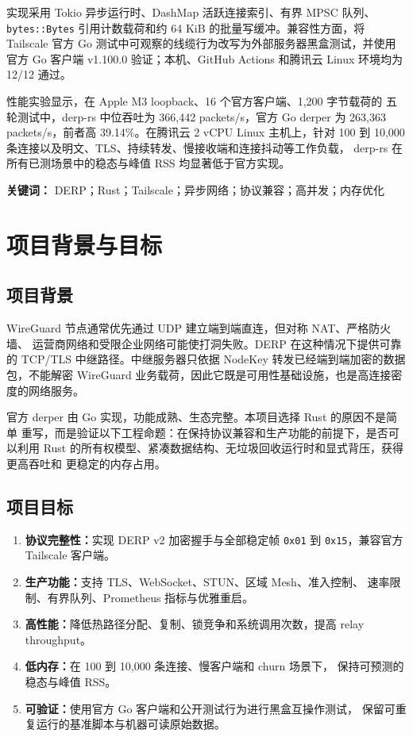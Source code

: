 \documentclass[UTF8,a4paper,zihao=-4]{ctexart}
\newcommand{\code}[1]{\texttt{\small #1}}
\begin{document}
实现采用 Tokio 异步运行时、DashMap 活跃连接索引、有界 MPSC 队列、
\code{bytes::Bytes} 引用计数载荷和约 64 KiB 的批量写缓冲。兼容性方面，将
Tailscale 官方 Go 测试中可观察的线缆行为改写为外部服务器黑盒测试，并使用
官方 Go 客户端 v1.100.0 验证；本机、GitHub Actions 和腾讯云 Linux 环境均为
12/12 通过。

性能实验显示，在 Apple M3 loopback、16 个官方客户端、1,200 字节载荷的
五轮测试中，derp-rs 中位吞吐为 366,442 packets/s，官方 Go derper 为
263,363 packets/s，前者高 39.14\%。在腾讯云 2 vCPU Linux 主机上，针对
100 到 10,000 条连接以及明文、TLS、持续转发、慢接收端和连接抖动等工作负载，
derp-rs 在所有已测场景中的稳态与峰值 RSS 均显著低于官方实现。

\textbf{关键词：} DERP；Rust；Tailscale；异步网络；协议兼容；高并发；内存优化

\clearpage
\begingroup
\footnotesize
\tableofcontents
\endgroup
\clearpage
{}

\section{项目背景与目标}

\subsection{项目背景}

WireGuard 节点通常优先通过 UDP 建立端到端直连，但对称 NAT、严格防火墙、
运营商网络和受限企业网络可能使打洞失败。DERP 在这种情况下提供可靠的 TCP/TLS
中继路径。中继服务器只依据 NodeKey 转发已经端到端加密的数据包，不能解密
WireGuard 业务载荷，因此它既是可用性基础设施，也是高连接密度的网络服务。

官方 derper 由 Go 实现，功能成熟、生态完整。本项目选择 Rust 的原因不是简单
重写，而是验证以下工程命题：在保持协议兼容和生产功能的前提下，是否可以利用
Rust 的所有权模型、紧凑数据结构、无垃圾回收运行时和显式背压，获得更高吞吐和
更稳定的内存占用。

\subsection{项目目标}

\begin{enumerate}
  \item \textbf{协议完整性：}实现 DERP v2 加密握手与全部稳定帧
    \code{0x01} 到 \code{0x15}，兼容官方 Tailscale 客户端。
  \item \textbf{生产功能：}支持 TLS、WebSocket、STUN、区域 Mesh、准入控制、
    速率限制、有界队列、Prometheus 指标与优雅重启。
  \item \textbf{高性能：}降低热路径分配、复制、锁竞争和系统调用次数，提高
    relay throughput。
  \item \textbf{低内存：}在 100 到 10,000 条连接、慢客户端和 churn 场景下，
    保持可预测的稳态与峰值 RSS。
  \item \textbf{可验证：}使用官方 Go 客户端和公开测试行为进行黑盒互操作测试，
    保留可重复运行的基准脚本与机器可读原始数据。
\end{enumerate}
\end{document}
